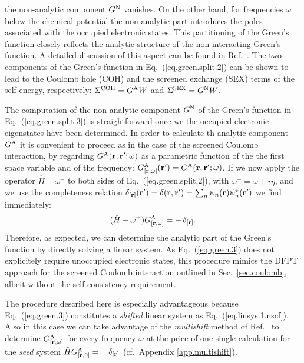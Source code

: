 \documentclass[twocolumn,prb,showpacs,superscriptaddress]{revtex4}
\def\w{\omega}
\def\H{\hat{H}}
\def\r{{\bf r}}
\def\rp{{\bf r^\prime}}
\begin{document}
the non-analytic component $G^{\rm N}$ vanishes. On the other hand, for frequencies $\w$
below the chemical potential the non-analytic part introduces the poles associated with the occupied 
electronic states. 
This partitioning of the Green's function closely reflects the analytic structure
of the non-interacting Green's function.
A detailed discussion of this aspect can be found in Ref.\ .
The two components of the Green's function in Eq.\ (\ref{eq.green.split.2}) can be shown
to lead to the Coulomb hole (COH) and the screened exchange (SEX) terms of the
self-energy, respectively:\cite{hl86} 
$\Sigma^{\rm COH} = G^{\rm A} W$  and $\Sigma^{\rm SEX} = G^{\rm N} W$.

The computation of the non-analytic component $G^{\rm N}$ of the
Green's function in Eq.\ (\ref{eq.green.split.3}) is straightforward 
once we the occupied electronic eigenstates have been determined.
In order to calculate th analytic component $G^{\rm A}$ it is convenient to
proceed as in the case of the screened Coulomb interaction,
by regarding $G^{\rm A}(\r,\rp;\w)$ as a parametric
function of the the first space variable and of the frequency:
$G^{\rm A}_{[\r,\w]}(\rp) = G^{\rm A}(\r,\rp;\w)$.
If we now apply the operator $\H-\w^+$ to both sides of Eq.\ (\ref{eq.green.split.2}),
with $\w^+=\w+i\eta$,
and we use the completeness relation $\delta_{[\r]}(\rp) = \delta(\r,\rp) = \sum_n \psi_n(\r)\psi_n^\star(\rp)$
we find immediately:
  \begin{equation}\label{eq.green.3}
  (\H-\w^+) G^{\rm A}_{[\r,\w]} = -\, \delta_{[\r]}.
  \end{equation}
Therefore, as expected, we can determine the analytic part of the Green's function
by directly solving a linear system. As Eq.\ (\ref{eq.green.3}) 
does not explicitely require unoccupied electronic states, this procedure mimics 
the DFPT approach for the screened Coulomb interaction outlined in Sec.\ \ref{sec.coulomb},
albeit without the self-consistency requirement.

The procedure described here is especially advantageous because Eq.\ (\ref{eq.green.3})
constitutes a {\it shifted} linear system as Eq.\ (\ref{eq.linsys.1.nscf}).
Also in this case we can take
advantage of the {\it multishift} method of Ref.\ 
to determine $G^{\rm A}_{[\r,\w]}$ for every frequency $\w$
at the price of one single calculation for the {\it seed} system $\H G^{\rm A}_{[\r,0]} = -\, \delta_{[\r]}$
(cf.\ Appendix \ref{app.multishift}).
\end{document}
